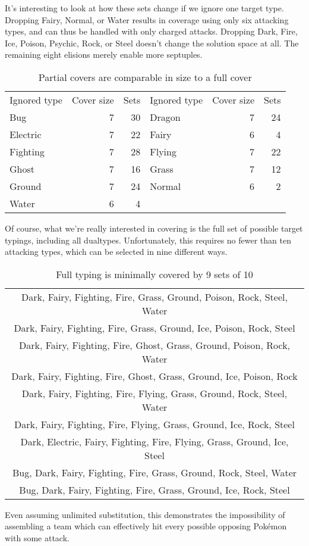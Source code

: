 It's interesting to look at how these sets change if we ignore one target type.
Dropping Fairy, Normal, or Water results in coverage using only six attacking types,
  and can thus be handled with only charged attacks.
Dropping Dark, Fire, Ice, Poison, Psychic, Rock, or Steel doesn't change the solution space at all.
The remaining eight elisions merely enable more septuples.
\begin{table}[ht]
\begin{centering}
  \begin{tabular}{lrrlrr}
    Ignored type & Cover size & Sets & Ignored type & Cover size & Sets\\
    \Midrule
    Bug & 7 & 30 & Dragon & 7 & 24\\
    Electric & 7 & 22 & Fairy & 6 & 4\\
    Fighting & 7 & 28 & Flying & 7 & 22\\
    Ghost & 7 & 16 & Grass & 7 & 12\\
    Ground & 7 & 24 & Normal & 6 & 2\\
    Water & 6 & 4 & & & \\
  \end{tabular}
  \label{table:partialcovers}
  \caption{Partial covers are comparable in size to a full cover}
\end{centering}
\end{table}

Of course, what we're really interested in covering is the full set
  of possible target typings, including all dualtypes.
Unfortunately, this requires no fewer than ten attacking types,
  which can be selected in nine different ways.
\begin{table}[ht]
\begin{centering}
  \begin{tabular}{c}
 Dark, Fairy, Fighting, Fire, Grass, Ground, Poison, Rock, Steel, Water\\
 Dark, Fairy, Fighting, Fire, Grass, Ground, Ice, Poison, Rock, Steel\\
 Dark, Fairy, Fighting, Fire, Ghost, Grass, Ground, Poison, Rock, Water\\
 Dark, Fairy, Fighting, Fire, Ghost, Grass, Ground, Ice, Poison, Rock\\
 Dark, Fairy, Fighting, Fire, Flying, Grass, Ground, Rock, Steel, Water\\
 Dark, Fairy, Fighting, Fire, Flying, Grass, Ground, Ice, Rock, Steel\\
 Dark, Electric, Fairy, Fighting, Fire, Flying, Grass, Ground, Ice, Steel\\
 Bug, Dark, Fairy, Fighting, Fire, Grass, Ground, Rock, Steel, Water\\
 Bug, Dark, Fairy, Fighting, Fire, Grass, Ground, Ice, Rock, Steel\\
  \end{tabular}
  \label{table:coversetsmono}
  \caption{Full typing is minimally covered by 9 sets of 10}
\end{centering}
\end{table}
Even assuming unlimited substitution, this demonstrates the
  impossibility of assembling a team which can effectively
  hit every possible opposing Pokémon with some attack.

